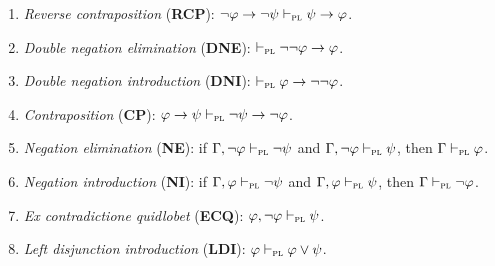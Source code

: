 \documentclass[a4paper, 11pt]{article}                  %
\begin{document}
\begin{enumerate}
	\item \textit{Reverse contraposition} (\textbf{RCP}): $\neg\varphi \rightarrow \neg\psi \vdash_{\textsc{pl}} \psi \rightarrow \varphi$.

	\item \textit{Double negation elimination} (\textbf{DNE}): $\vdash_{\textsc{pl}} \neg\neg\varphi \rightarrow \varphi$.

	\item \textit{Double negation introduction} (\textbf{DNI}): $\vdash_{\textsc{pl}} \varphi \rightarrow \neg\neg\varphi$.

	\item \textit{Contraposition} (\textbf{CP}): $\varphi \rightarrow \psi \vdash_{\textsc{pl}} \neg\psi \rightarrow \neg\varphi$.

	\item \textit{Negation elimination} (\textbf{NE}): if $\Gamma, \neg\varphi \vdash_{\textsc{pl}} \neg\psi$ and $\Gamma, \neg\varphi \vdash_{\textsc{pl}} \psi$, then $\Gamma \vdash_{\textsc{pl}} \varphi$.

	\item \textit{Negation introduction} (\textbf{NI}): if $\Gamma, \varphi \vdash_{\textsc{pl}} \neg\psi$ and $\Gamma, \varphi \vdash_{\textsc{pl}} \psi$, then $\Gamma \vdash_{\textsc{pl}} \neg\varphi$.

	\item \textit{Ex contradictione quidlobet} (\textbf{ECQ}): $\varphi, \neg\varphi \vdash_{\textsc{pl}} \psi$.

	\item \textit{Left disjunction introduction} (\textbf{LDI}): $\varphi \vdash_{\textsc{pl}} \varphi \vee \psi$.


\end{enumerate}
\end{document}
